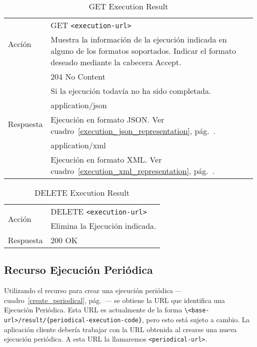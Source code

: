 \begin{table}
\begin{tabularx}{\textwidth}{l X}
\multirow{2}{*}{Acción}
 & GET \verb+<execution-url>+ \\
 & Muestra la información de la ejecución indicada en alguno de los
formatos soportados. Indicar el formato deseado mediante la cabecera Accept.\\ \hline
\multirow{6}{*}{Respuesta}
& 204 No Content \\
& Si la ejecución todavía no ha sido completada.\\ \cline{2-2}
& application/json \\
& Ejecución en formato JSON. Ver cuadro~\ref{execution_json_representation}, pág.~\pageref{execution_json_representation}.\\ \cline{2-2}
& application/xml \\
& Ejecución en formato XML. Ver cuadro~\ref{execution_xml_representation}, pág.~\pageref{execution_xml_representation}. \\
\end{tabularx}
\caption{GET Execution Result}
\label{get_execution_result}
\end{table}

\begin{table}
\begin{tabularx}{\textwidth}{l X}
\multirow{2}{*}{Acción}
 & DELETE \verb+<execution-url>+\\
 & Elimina la Ejecución indicada.\\ \hline
\multirow{1}{*}{Respuesta}
 & 200 OK \\
\end{tabularx}
\caption{DELETE Execution Result}
\label{delete_execution_result}
\end{table}
\newpage

\subsection{Recurso Ejecución Periódica}

Utilizando el recurso para crear una ejecución periódica
---cuadro~\ref{create_periodical}, pág.~\pageref{create_periodical}---
se obtiene la URL que identifica una Ejecución Periódica. Esta URL es
actualmente de la forma
\verb+\<base-url>/result/{periodical-execution-code}+, pero esto está
sujeto a cambio. La aplicación cliente debería trabajar con la URL
obtenida al crearse una nueva ejecución periódica. A esta URL la
llamaremos \verb+<periodical-url>+.

